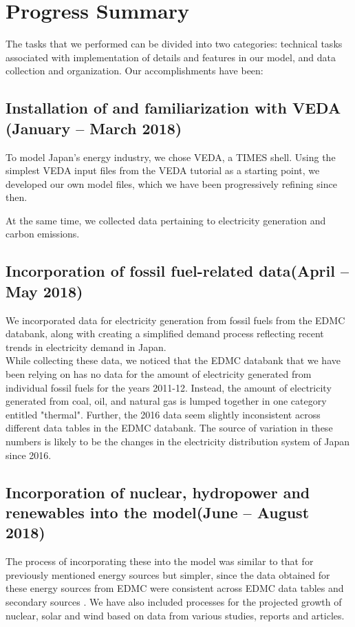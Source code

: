 \documentclass[14pt,a4paper]{article} %
\begin{document}
\section{Progress Summary}

The tasks that we performed can be divided into two categories: technical tasks associated with implementation of details and features in our model, and data collection and organization. Our accomplishments have been:

\subsection{Installation of and familiarization with VEDA (January – March 2018)}
To model Japan's energy industry, we chose VEDA, a \gls{TIMES} \cite{loulou_documentation_2005,gargiulo_documentation_2005} shell. Using the simplest VEDA input files from the VEDA tutorial \cite{gargiulo_documentation_2005} as a starting point, we developed our own model files, which we have been progressively refining since then.

At the same time, we collected data pertaining to electricity generation and carbon emissions.

\subsection{Incorporation of fossil fuel-related data(April – May 2018)}
We incorporated data for electricity generation from fossil fuels from the \gls{EDMC} databank\cite{noauthor_energy_2018}, along with creating a simplified demand process reflecting recent trends in electricity demand in Japan.\\

While collecting these data, we noticed that the \gls{EDMC} databank that we have been relying on has no data for the amount of electricity generated from individual fossil fuels for the years 2011-12. Instead, the amount of electricity generated from coal, oil, and natural gas is lumped together in one category entitled "thermal". Further, the 2016 data seem slightly inconsistent across different data tables in the \gls{EDMC} databank. The source of variation in these numbers is likely to be the changes in the electricity distribution system of Japan since 2016.

\subsection{Incorporation of nuclear, hydropower and renewables into the model(June – August 2018)}
The process of incorporating these into the model was similar to that for previously mentioned energy sources but simpler, since the data obtained for these energy sources from \gls{EDMC} were consistent across \gls{EDMC} data tables and secondary sources \cite{noauthor_energy_2018,noauthor_iea_2017, noauthor_japan_2017}. We have also included processes for the projected growth of nuclear, solar and wind based on data from various studies, reports and articles. \cite{publicover_japan_2017, dincer_analysis_2011,noauthor_geothermal_2018,heger_wind_2016,noauthor_operational_2013,noauthor_electricity_2017}
\end{document}
